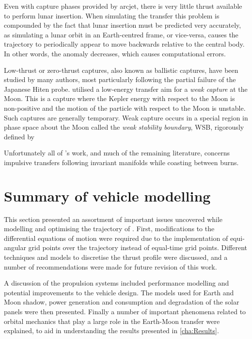 Even with capture phases provided by arcjet, there is very little thrust available to perform lunar insertion. When simulating the transfer this problem is compounded by the fact that lunar insertion must be predicted very accurately, as simulating a lunar orbit in an Earth-centred frame, or vice-versa, causes the trajectory to periodically appear to move backwards relative to the central body. In other words, the anomaly decreases, which causes computational errors.

Low-thrust or zero-thrust captures, also known as ballistic captures, have been studied by many authors, most particularly \textcite{Belbruno2004} following the partial failure of the Japanese Hiten probe. \citeauthor{Belbruno2004} utilised a low-energy transfer
aim for a \emph{weak capture} at the Moon. This is a capture where the Kepler energy with respect to the Moon is non-positive and the motion of the particle with respect to the Moon is unstable. Such captures are generally temporary. Weak capture occurs in a special region in phase space about the Moon called the \emph{weak stability boundary}, WSB, rigorously defined by \textcite{Belbruno2004}

Unfortunately all of \citeauthor{Belbruno2004}'s work, and much of the remaining literature, concerns impulsive transfers following invariant manifolds while coasting between burns.

 

\section{Summary of vehicle modelling} \label{sec:Summary-vehicle}

This section presented an assortment of important issues uncovered while modelling and optimising the trajectory of \BW. First, modifications to the differential equations of motion were required due to the implementation of equi-angular grid points over the trajectory instead of equal-time grid points. Different techniques and models to discretise the thrust profile were discussed, and a number of recommendations were made for future revision of this work. 

A discussion of the propulsion systems included performance modelling and potential improvements to the vehicle design. The models used for Earth and Moon shadow, power generation and consumption and degradation of the solar panels were then presented. Finally a number of important phenomena related to orbital mechanics that play a large role in the Earth-Moon transfer were explained, to aid in understanding the results presented in \autoref{cha:Results}.